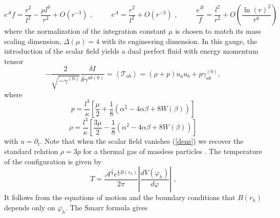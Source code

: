 \documentclass[11pt,epsf,letterpaper]{article}%
\begin{document}
\begin{equation}
e^{A}f=\frac{r^{2}}{l^{2}}-\frac{\mu l^{6}}{r^{2}}+O(r^{-3})\text{ ,}%
\qquad\text{ }e^{A}=\frac{r^{2}}{l^{2}}+O(r^{-3})\text{ ,}\qquad\text{ }%
\frac{e^{B}}{f}=\frac{l^{2}}{r^{2}}+O(\frac{\ln\left(  r\right)  ^{2}}{r^{6}})
\label{expa}%
\end{equation}
where the normalization of the integration constant $\mu$ is chosen to match
its mass scaling dimension, $\Delta\left(  \mu\right)  =4$ with its
engineering dimension. In this gauge, the introduction of the scalar field
yields a dual perfect fluid with energy momentum tensor
\cite{Anabalon:2016yfg}
\begin{equation}
-\frac{2}{\sqrt{-\gamma^{\left(  0\right)  }}}\frac{\delta I}{\delta
\gamma^{ab(0)}}=\left\langle \mathcal{T}_{ab}\right\rangle =\left(
\rho+p\right)  u_{a}u_{b}+p\gamma_{ab}^{(0)},
\end{equation}
where
\begin{equation}
p=\frac{l^{3}}{\kappa}\left[  \frac{\mu}{2}+\frac{1}{8}\left(  \alpha
^{2}-4\alpha\beta+8W(\beta)\right)  \right]  \label{press}%
\end{equation}%
\begin{equation}
\rho=\frac{l^{3}}{\kappa}\left[  \frac{3\mu}{2}-\frac{1}{8}\left(  \alpha
^{2}-4\alpha\beta+8W(\beta)\right)  \right]  \label{dens}%
\end{equation}
with $u=\partial_{t}$. Note that when the scalar field vanishes (\ref{dens})
we recover the standard relation $\rho=3p$ for a thermal gas of massless
particles \cite{Myers:1999psa}. The temperature of the configuration is given
by%
\begin{equation}
T=\frac{\mathcal{A}^{\frac{1}{3}}e^{\frac{1}{2}B(r_{h})}}{2\pi}\left\vert
\frac{dV\left(  \varphi_{h}\right)  }{d\varphi}\right\vert \text{ ,}%
\end{equation}
It follows from the equations of motion and the boundary conditions that
$B(r_{h})$ depends only on $\varphi_{h}$. The Smarr formula gives
\cite{Liu:2015tqa}%
\end{document}
